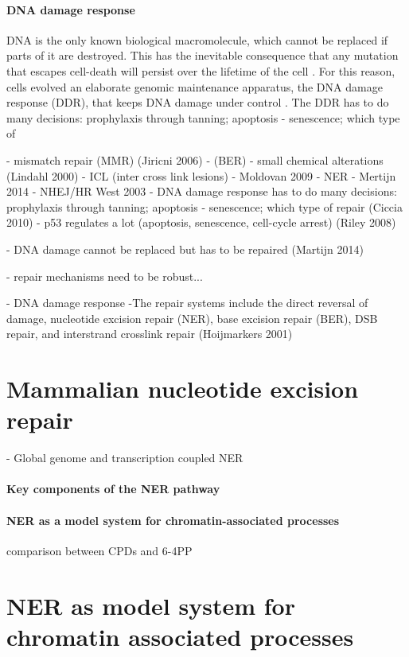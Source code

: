 \paragraph{DNA damage response}    
DNA is the only known biological macromolecule, which cannot be replaced if parts of it are destroyed. This has the inevitable consequence that any mutation that escapes cell-death will persist over the lifetime of the cell \cite{Hoeijmakers2009,Marteijn2014}. For this reason, cells evolved an elaborate genomic maintenance apparatus, the DNA damage response (DDR), that keeps DNA damage under control \cite{Ciccia2010}. The DDR  
has to do many decisions: prophylaxis through tanning; apoptosis - senescence; which type of



- mismatch repair (MMR) (Jiricni 2006)
- (BER) - small chemical alterations (Lindahl 2000)
- ICL (inter cross link lesions) - Moldovan 2009
- NER - Mertijn 2014
- NHEJ/HR  West 2003
- DNA damage response has to do many decisions: prophylaxis through tanning; apoptosis - senescence; which type of repair (Ciccia 2010)
- p53 regulates a lot (apoptosis, senescence, cell-cycle arrest) (Riley 2008)


- DNA damage cannot be replaced but has to be repaired (Martijn 2014)

- repair mechanisms need to be robust...

 
- DNA damage response
-The repair systems include the direct reversal of
damage, nucleotide excision repair (NER), base excision repair (BER), DSB repair, and interstrand crosslink repair (Hoijmarkers 2001)

\section{Mammalian nucleotide excision repair}
\label{sec:NERexperiments}
- Global genome and transcription coupled NER

\paragraph{Key components of the NER pathway}
\paragraph{NER as a model system for chromatin-associated processes}
comparison between CPDs and 6-4PP

\section{NER as model system for chromatin associated processes}

